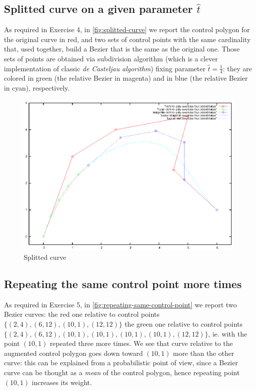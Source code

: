 \documentclass{article}
\begin{document}
\subsection{Splitted curve on a given parameter $\hat{t}$}
As required in Exercise 4, in \autoref{fig:splitted-curve} we report
the control polygon for the original curve in red, and two sets of
control points with the same cardinality that, used together, build a
Bezier that is the same as the original one. Those sets of points are
obtained via subdivision algorithm (which is a clever implementation of
classic \emph{de Casteljau algorithm}) fixing parameter $\hat{t} =
\frac{1}{4}$: they are colored in green (the relative Bezier in magenta)
and in blue (the relative Bezier in cyan), respectively.
\begin{figure}[h!]
  \centering
  \includegraphics{bezier-deCasteljau-curves/exercise-four}
  \caption{Splitted curve}
  \label{fig:splitted-curve}
\end{figure}

\subsection{Repeating the same control point more times}
As required in Exercise 5, in
\autoref{fig:repeating-same-control-point} we report two Bezier curves: the
red one relative to control points $\{(2,4), (6,12), (10,1),
(12,12)\}$ the green one relative to control points $\{(2,4), (6,12),
(10,1), (10,1), (10,1), (10,1), (12,12)\}$, ie. with the point
$(10,1)$ repeated three more times. We see that curve relative to
the augmented control polygon goes down toward $(10,1)$ more than the
other curve: this can be explained from a probabilistic point of
view, since a Bezier curve can be thought as a \emph{mean} of the control
polygon, hence repeating point $(10,1)$ increases its weight.
\end{document}
